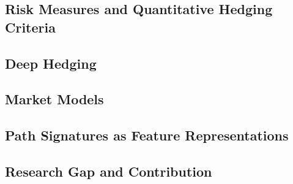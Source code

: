 
\subsection{Risk Measures and Quantitative Hedging Criteria}
\label{subsec:risk_measures}


\subsection{Deep Hedging}
\label{subsec:deep_hedging}


\subsection{Market Models}
\label{subsec:market_models}


\subsection{Path Signatures as Feature Representations}
\label{subsec:path_signatures}


\subsection{Research Gap and Contribution}
\label{subsec:research_gap}

